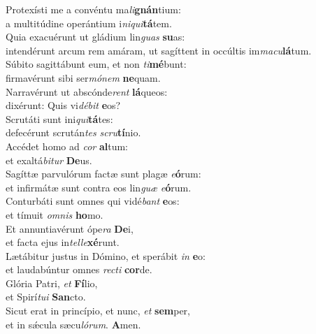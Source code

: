 \evenverse Protexísti me a convéntu ma\textit{li}\textbf{gnán}tium:~\*\\
\evenverse a multitúdine operántium i\textit{ni}\textit{qui}\textbf{tá}tem.\\
\oddverse Quia exacuérunt ut gládium lin\textit{guas} \textbf{su}as:~\*\\
\oddverse intendérunt arcum rem amáram, ut sagíttent in occúltis im\textit{ma}\textit{cu}\textbf{lá}tum.\\
\evenverse Súbito sagittábunt eum, et non \textit{ti}\textbf{mé}bunt:~\*\\
\evenverse firmavérunt sibi ser\textit{mó}\textit{nem} \textbf{ne}quam.\\
\oddverse Narravérunt ut abscónde\textit{rent} \textbf{lá}queos:~\*\\
\oddverse dixérunt: Quis vi\textit{dé}\textit{bit} \textbf{e}os?\\
\evenverse Scrutáti sunt ini\textit{qui}\textbf{tá}tes:~\*\\
\evenverse defecérunt scrután\textit{tes} \textit{scru}\textbf{tí}nio.\\
\oddverse Accédet homo ad \textit{cor} \textbf{al}tum:~\*\\
\oddverse et exaltá\textit{bi}\textit{tur} \textbf{De}us.\\
\evenverse Sagíttæ parvulórum factæ sunt plagæ \textit{e}\textbf{ó}rum:~\*\\
\evenverse et infirmátæ sunt contra eos lin\textit{guæ} \textit{e}\textbf{ó}rum.\\
\oddverse Conturbáti sunt omnes qui vidé\textit{bant} \textbf{e}os:~\*\\
\oddverse et tímuit \textit{om}\textit{nis} \textbf{ho}mo.\\
\evenverse Et annuntiavérunt ópe\textit{ra} \textbf{De}i,~\*\\
\evenverse et facta ejus in\textit{tel}\textit{le}\textbf{xé}runt.\\
\oddverse Lætábitur justus in Dómino, et sperábit \textit{in} \textbf{e}o:~\*\\
\oddverse et laudabúntur omnes \textit{re}\textit{cti} \textbf{cor}de.\\
\evenverse Glória Patri, \textit{et} \textbf{Fí}lio,~\*\\
\evenverse et Spirí\textit{tu}\textit{i} \textbf{San}cto.\\
\oddverse Sicut erat in princípio, et nunc, \textit{et} \textbf{sem}per,~\*\\
\oddverse et in sǽcula sæcu\textit{ló}\textit{rum}. \textbf{A}men.\\
